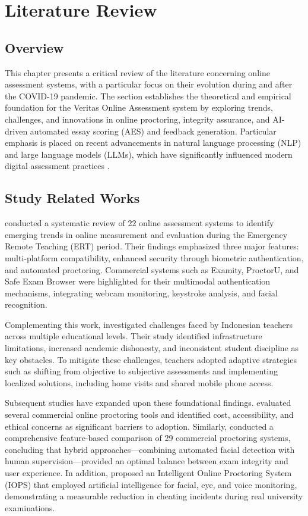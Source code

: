 \section{Literature Review}

\subsection{Overview}
This chapter presents a critical review of the literature concerning online assessment systems, with a particular focus on their evolution during and after the COVID-19 pandemic. The section establishes the theoretical and empirical foundation for the Veritas Online Assessment system by exploring trends, challenges, and innovations in online proctoring, integrity assurance, and AI-driven automated essay scoring (AES) and feedback generation. Particular emphasis is placed on recent advancements in natural language processing (NLP) and large language models (LLMs), which have significantly influenced modern digital assessment practices \citep{Topuz2022,Hussein2020}.

\subsection{Study Related Works}

\citet{Topuz2022} conducted a systematic review of 22 online assessment systems to identify emerging trends in online measurement and evaluation during the Emergency Remote Teaching (ERT) period. Their findings emphasized three major features: multi-platform compatibility, enhanced security through biometric authentication, and automated proctoring. Commercial systems such as Examity, ProctorU, and Safe Exam Browser were highlighted for their multimodal authentication mechanisms, integrating webcam monitoring, keystroke analysis, and facial recognition.

Complementing this work, \citet{Kurniati2023} investigated challenges faced by Indonesian teachers across multiple educational levels. Their study identified infrastructure limitations, increased academic dishonesty, and inconsistent student discipline as key obstacles. To mitigate these challenges, teachers adopted adaptive strategies such as shifting from objective to subjective assessments and implementing localized solutions, including home visits and shared mobile phone access.

Subsequent studies have expanded upon these foundational findings. \citet{Hussein2020} evaluated several commercial online proctoring tools and identified cost, accessibility, and ethical concerns as significant barriers to adoption. Similarly, \citet{Arno2021} conducted a comprehensive feature-based comparison of 29 commercial proctoring systems, concluding that hybrid approaches—combining automated facial detection with human supervision—provided an optimal balance between exam integrity and user experience. In addition, \citet{JiaHe2021} proposed an Intelligent Online Proctoring System (IOPS) that employed artificial intelligence for facial, eye, and voice monitoring, demonstrating a measurable reduction in cheating incidents during real university examinations.

